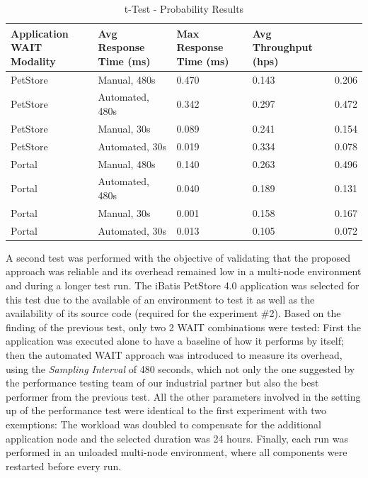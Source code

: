 \documentclass[runningheads,a4paper]{llncs}
\begin{document}
\begin{table}[!h]
\caption{t-Test - Probability Results}
\label{tTest1}
\centering
\begin{tabular}{p{}|p{}|p{}|p{}|p{}}
\hline
\bfseries Application \bfseries WAIT Modality & \bfseries Avg Response Time
(ms)& \bfseries Max Response Time (ms)& \bfseries Avg Throughput (hps)&\\
\hline
PetStore & 	Manual, 480s 			& 0.470 & 0.143	& 0.206\\
PetStore & 	Automated, 480s 		& 0.342	& 0.297	& 0.472\\
PetStore & 	Manual, 30s 			& 0.089	& 0.241	& 0.154\\
PetStore & 	Automated, 30s 			& 0.019	& 0.334	& 0.078\\
\hline
Portal 	& 	Manual, 480s 			& 0.140 & 0.263	& 0.496\\
Portal 	& 	Automated, 480s 		& 0.040	& 0.189	& 0.131\\
Portal 	& 	Manual, 30s 			& 0.001	& 0.158	& 0.167\\
Portal 	& 	Automated, 30s 			& 0.013	& 0.105	& 0.072\\
\hline
\end{tabular}
\end{table}

A second test was performed with the objective of validating that the proposed
approach was reliable and its overhead remained low in a multi-node environment
and during a longer test run. The iBatis PetStore 4.0 application was selected for 
this test due to the available of an environment to test it as well as the
availability of its source code (required for the experiment \#2). Based on the 
finding of the previous test, only two 2 WAIT combinations were tested: First
the application was executed alone to have a baseline of how it performs by itself; 
then the automated WAIT approach was introduced to measure its overhead, using the 
\emph{Sampling Interval} of 480 seconds, which not only the one suggested by
the performance testing team of our industrial partner but also the best 
performer from the previous test. All the other parameters involved in the
setting up of the performance test were identical to the first experiment with 
two exemptions: The workload was doubled to compensate for the additional
application node and the selected duration was 24 hours. Finally, each run was performed 
in an unloaded multi-node environment, where all components were restarted
before every run.
\end{document}
